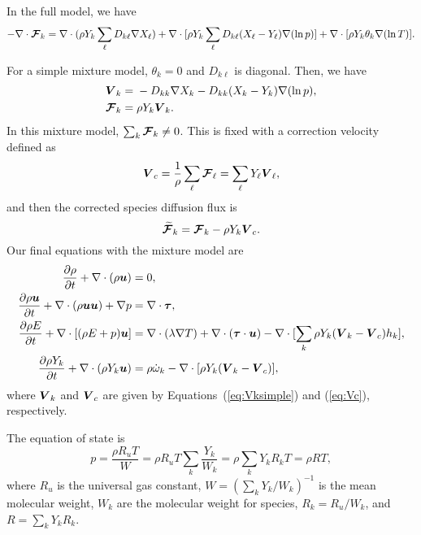 \documentclass[11pt,letterpaper]{article}
\renewcommand{\vec}[1]{\mbox{\boldmath$#1$}}
\newcommand{\tensor}[1]{\mbox{\boldmath{\ensuremath{#1}}}}
\begin{document}
In the full model, we have
\begin{equation}
-\nabla \cdot \vec{\mathcal{F}}_k = \nabla \cdot (\rho Y_k \sum_\ell D_{k\ell}
  \nabla X_\ell) + \nabla \cdot [\rho Y_k \sum_\ell D_{k\ell} (X_\ell-Y_\ell)
  \nabla (\ln{p}) ] + \nabla \cdot [\rho
  Y_k \theta_k \nabla (\ln{T})].
\end{equation}

For a simple mixture model, $\theta_k = 0$ and $D_{k\ell}$ is
diagonal.  Then, we have
\begin{align}
\vec{V}_k = {}& -D_{kk} \nabla X_k - D_{kk} (X_k-Y_k)
  \nabla (\ln{p}), \label{eq:Vksimple} \\
\vec{\mathcal{F}}_k = {}& \rho Y_k \vec{V}_k.
\end{align}
In this mixture model, $\sum_k \vec{\mathcal{F}}_k \neq
0$. This is fixed with a correction velocity defined as
\begin{equation}
  \vec{V}_c = \frac{1}{\rho}\sum_\ell \vec{\mathcal{F}}_\ell =
  \sum_\ell Y_\ell \vec{V}_\ell, \label{eq:Vc}
\end{equation}
and then the corrected species diffusion flux is
\begin{equation}
  \vec{\widetilde{\mathcal{F}}}_k = \vec{\mathcal{F}}_k - \rho Y_k \vec{V}_c. \label{eq:corr}
\end{equation}
Our final equations with the mixture model are
\begin{align}
\frac{\partial \rho}{\partial t} + \nabla \cdot (\rho
    \vec{u})= { } & 0, \\
\frac{\partial \rho \vec{u}}{\partial t} + \nabla \cdot (\rho
    \vec{u}\vec{u}) + \nabla p= { } & \nabla \cdot
  \tensor{\tau}, \\
\frac{\partial \rho E}{\partial t} + \nabla \cdot [(\rho E + p)
  \vec{u}] = { } & \nabla \cdot (\lambda \nabla T) + \nabla \cdot
  (\tensor{\tau} \cdot \vec{u}) - \nabla \cdot [\sum_k\rho Y_k
  (\vec{V}_k -\vec{V}_c) h_k ], \label{eq:rhoE2} \\
\frac{\partial \rho Y_k}{\partial t} + \nabla \cdot (\rho Y_k \vec{u})
= { } & \rho \dot{\omega}_k  - \nabla \cdot [\rho Y_k
  (\vec{V}_k -\vec{V}_c) ], \label{eq:rhoY2}
\end{align} 
where $\vec{V}_k$ and $\vec{V}_c$ are given by
Equations~(\ref{eq:Vksimple}) and (\ref{eq:Vc}), respectively.

The equation of state is
\begin{equation}
  p = \frac{\rho R_u T}{W} = \rho R_u T \sum_k \frac{Y_k}{W_k} =
  \rho \sum_k Y_k R_k T = \rho R T,
\end{equation}
where $R_u$ is the universal gas constant, $W = (\sum_k Y_k/W_k)^{-1}$
is the mean molecular weight, $W_k$ are the molecular weight for
species, $R_k = R_u/W_k$, and $R = \sum_k Y_k R_k$.
\end{document}
